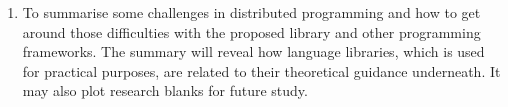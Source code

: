 \begin{enumerate}
  \item To summarise some challenges in distributed programming and how to get around those difficulties with the proposed library and other programming frameworks.  The summary will reveal how language libraries, which is used for practical purposes, are related to their theoretical guidance underneath.  It may also plot research blanks for future study.
\end{enumerate}



